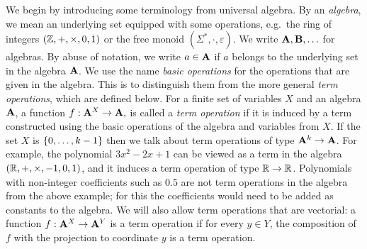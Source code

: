  We begin by introducing some terminology from universal algebra. By an \emph{algebra}, we mean an underlying set equipped with some  operations, e.g.~the ring of integers $(\mathbb Z, + , \times, 0, 1)$ or the free monoid $(\Sigma^*, \cdot, \varepsilon)$. We write $\mathbf{A}, \mathbf{B}, \ldots$ for algebras. By abuse of notation, we write $a \in \mathbf{A}$ if $a$ belongs to the underlying set in the algebra $\mathbf{A}$. 
We use the name \emph{basic operations} for the operations that are given in the algebra. This is to distinguish them from the more general \emph{term operations}, which are defined below.
        For a finite set of variables $X$ and an algebra $\mathbf{A}$, a function $f : \mathbf{A}^X \to \mathbf{A},$
            is called a \emph{term operation} if it is induced by a  term  constructed using the basic operations of the algebra and variables from $X$.  If the set $X$ is $\{0,\ldots,k-1\}$ then we talk about term operations of type $\mathbf{A}^k \to \mathbf{A}$.
        For example, the polynomial $3x^2 -2x+1$ can be viewed as a term in the algebra
            $(\mathbb R, +,\times, -1,0,1)$,
        and it induces a term operation of type $\mathbb R \to \mathbb R$. 
        Polynomials with non-integer coefficients such as $0.5$  are not term operations in the algebra from the above example; for this the coefficients would need to be added as constants to the algebra. We will also allow term operations that are vectorial: a function $f : \mathbf{A}^X \to \mathbf{A}^Y$ is a term operation if for every $y \in Y$, the composition of $f$ with the projection to coordinate $y$ is a term operation. 
        

